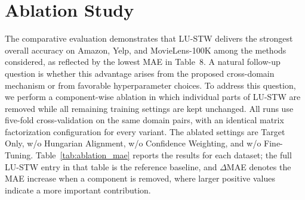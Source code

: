 
\section{Ablation Study}
\label{sec:ablation}

The comparative evaluation demonstrates that LU-STW delivers the strongest overall accuracy on Amazon, Yelp, and MovieLens-100K among the methods considered, as reflected by the lowest MAE in Table~8. A natural follow-up question is whether this advantage arises from the proposed cross-domain mechanism or from favorable hyperparameter choices. To address this question, we perform a component-wise ablation in which individual parts of LU-STW are removed while all remaining training settings are kept unchanged. All runs use five-fold cross-validation on the same domain pairs, with an identical matrix factorization configuration for every variant. The ablated settings are Target Only, w/o Hungarian Alignment, w/o Confidence Weighting, and w/o Fine-Tuning. Table~\ref{tab:ablation_mae} reports the results for each dataset; the full LU-STW entry in that table is the reference baseline, and $\Delta$MAE denotes the MAE increase when a component is removed, where larger positive values indicate a more important contribution.

